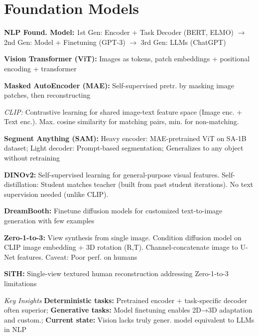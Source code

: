 \section{Foundation Models}

\textbf{NLP Found. Model:}
1st Gen: Encoder + Task Decoder (BERT, ELMO) $\to$ 2nd Gen: Model + Finetuning (GPT-3) $\to$ 3rd Gen: LLMs (ChatGPT)

\textbf{Vision Transformer (ViT):} Images as tokens, patch embeddings + positional encoding + transformer

\textbf{Masked AutoEncoder (MAE):} Self-supervised pretr. by masking image patches, then reconstructing

\emph{CLIP:} Contrastive learning for shared image-text feature space (Image enc. + Text enc.). Max. cosine similarity for matching pairs, min. for non-matching. 

\textbf{Segment Anything (SAM):} Heavy encoder: MAE-pretrained ViT on SA-1B dataset; Light decoder: Prompt-based segmentation; Generalizes to any object without retraining

\textbf{DINOv2:} Self-supervised learning for general-purpose visual features. Self-distillation: Student matches teacher (built from past student iterations). No text supervision needed (unlike CLIP).

\textbf{DreamBooth:} Finetune diffusion models for customized text-to-image generation with few examples

\textbf{Zero-1-to-3:} View synthesis from single image. Condition diffusion model on CLIP image embedding + 3D rotation (R,T). Channel-concatenate image to U-Net features. Caveat: Poor perf. on humans

\textbf{SiTH:} Single-view textured human reconstruction addressing Zero-1-to-3 limitations

\emph{Key Insights} \textbf{Deterministic tasks:} Pretrained encoder + task-specific decoder often superior; \textbf{Generative tasks:} Model finetuning enables 2D→3D adaptation and custom.; \textbf{Current state:} Vision lacks truly gener. model equivalent to LLMs in NLP